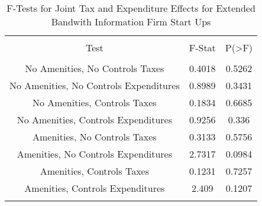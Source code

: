 
\begin{table}[!htbp] \centering 
  \caption{F-Tests for Joint Tax and Expenditure Effects for Extended Bandwith Information Firm Start Ups} 
  \label{51Ftests} 
\begin{tabular}{@{\extracolsep{5pt}} ccc} 
\\[-1.8ex]\hline 
\hline \\[-1.8ex] 
Test & F-Stat & P(\textgreater F) \\ 
\hline \\[-1.8ex] 
No Amenities, No Controls Taxes & 0.4018 & 0.5262 \\ 
No Amenities, No Controls Expenditures & 0.8989 & 0.3431 \\ 
No Amenities, Controls Taxes & 0.1834 & 0.6685 \\ 
No Amenities, Controls Expenditures & 0.9256 & 0.336 \\ 
Amenities, No Controls Taxes & 0.3133 & 0.5756 \\ 
Amenities, No Controls Expenditures & 2.7317 & 0.0984 \\ 
Amenities, Controls Taxes & 0.1231 & 0.7257 \\ 
Amenities, Controls Expenditures & 2.409 & 0.1207 \\ 
\hline \\[-1.8ex] 
\end{tabular} 
\end{table} 
